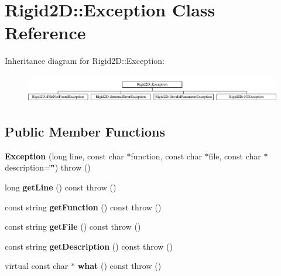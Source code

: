 \hypertarget{class_rigid2_d_1_1_exception}{
\section{Rigid2D::Exception Class Reference}
\label{class_rigid2_d_1_1_exception}
}
Inheritance diagram for Rigid2D::Exception:\begin{figure}[H]
\begin{center}
\leavevmode
\includegraphics[height=1.27273cm]{class_rigid2_d_1_1_exception}
\end{center}
\end{figure}
\subsection*{Public Member Functions}
\begin{DoxyCompactItemize}
\item 
\hypertarget{class_rigid2_d_1_1_exception_a3fdfe02d0a8180bf56acf748d352a648}{
{\bfseries Exception} (long line, const char $\ast$function, const char $\ast$file, const char $\ast$description=\char`\"{}\char`\"{})  throw ()}
\label{class_rigid2_d_1_1_exception_a3fdfe02d0a8180bf56acf748d352a648}

\item 
\hypertarget{class_rigid2_d_1_1_exception_add9063278d286f38c52e2e1ff69e1385}{
long {\bfseries getLine} () const   throw ()}
\label{class_rigid2_d_1_1_exception_add9063278d286f38c52e2e1ff69e1385}

\item 
\hypertarget{class_rigid2_d_1_1_exception_a6b63bea3e7d9b390aecccff04a407dd5}{
const string {\bfseries getFunction} () const   throw ()}
\label{class_rigid2_d_1_1_exception_a6b63bea3e7d9b390aecccff04a407dd5}

\item 
\hypertarget{class_rigid2_d_1_1_exception_a86f93b6feeb5ffdc95394e93d0397351}{
const string {\bfseries getFile} () const   throw ()}
\label{class_rigid2_d_1_1_exception_a86f93b6feeb5ffdc95394e93d0397351}

\item 
\hypertarget{class_rigid2_d_1_1_exception_a89d37cc7e57f20f22e385c6624bf8bd1}{
const string {\bfseries getDescription} () const   throw ()}
\label{class_rigid2_d_1_1_exception_a89d37cc7e57f20f22e385c6624bf8bd1}

\item 
\hypertarget{class_rigid2_d_1_1_exception_aa05952f0d7737cea58960a684b1f8ac9}{
virtual const char $\ast$ {\bfseries what} () const   throw ()}
\label{class_rigid2_d_1_1_exception_aa05952f0d7737cea58960a684b1f8ac9}

\end{DoxyCompactItemize}
